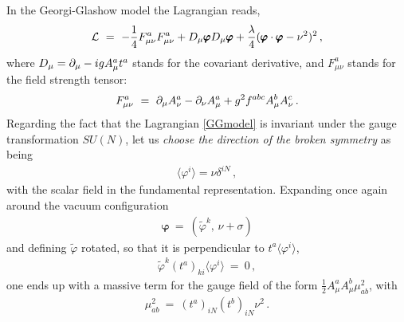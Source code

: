 \begin{itemize}
In the Georgi-Glashow model the Lagrangian reads,
\begin{eqnarray}
{\cal L} ~=~ -\frac{1}{4}F^{a}_{\mu\nu}F^{a}_{\mu\nu} + D_{\mu}\pmb{\varphi} D_{\mu}\pmb{\varphi} +
\frac{\lambda}{4}(\pmb{\varphi}\cdot\pmb{\varphi} - \nu^{2})^{2} \,,
\label{GGmodel}
\end{eqnarray}
where $D_{\mu} = \partial_{\mu} -igA^{a}_{\mu}t^{a}$ stands for the covariant derivative, and
$F^{a}_{\mu\nu}$ stands for the field strength tensor:
\begin{eqnarray}
F^{a}_{\mu\nu} ~=~ \partial_{\mu}A^{a}_{\nu} - \partial_{\nu}A^{a}_{\mu} +
g^{2}f^{abc}A^{b}_{\mu}A^{c}_{\nu}\,.
\end{eqnarray}
Regarding
the fact that the Lagrangian \eqref{GGmodel} is invariant under the gauge transformation
$SU(N)$, let us {\it choose the direction of the broken symmetry} as being
\begin{eqnarray}
\langle \varphi^{i} \rangle = \nu\delta^{iN}\,,
\end{eqnarray}
with the scalar field in the fundamental representation. Expanding once again around the vacuum
configuration
\begin{eqnarray}
\pmb{\varphi} ~=~ (\tilde{\varphi}^{k},\,\nu + \sigma)
\label{unitgauge}
\end{eqnarray}
 and defining $\tilde{\varphi}$ rotated, so that it is perpendicular to $t^{a}\langle \varphi^{i} \rangle$,
\begin{eqnarray}
\tilde{\varphi}^{k}(t^{a})_{ki}\langle \varphi^{i}\rangle~=~ 0\,,
\label{unitycondit}
\end{eqnarray}
one ends up with a massive term for the gauge field of the form
$\frac{1}{2}A^{a}_{\mu}A^{b}_{\mu}\mu^{2}_{ab}$,
with \cite{Weinberg:1996kr,Peskin:1995ev,Ryder:1985wq}
\begin{eqnarray}
\mu^{2}_{ab} ~=~ (t^{a})_{iN}(t^{b})_{iN}\nu^{2}\,.
\label{gaugemass}
\end{eqnarray}


\end{itemize}
